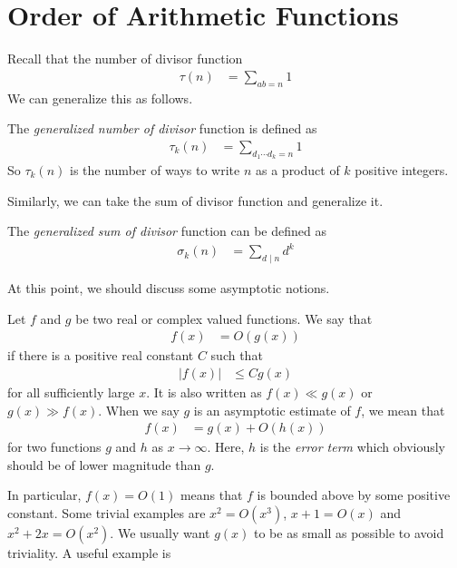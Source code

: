 \documentclass[elemannt.tex]{subfile}
\begin{document}
	\section{Order of Arithmetic Functions}
	Recall that the number of divisor function 
		\begin{align*}
			\tau(n)
				&  =\sum_{ab=n}1
		\end{align*}
	We can generalize this as follows.
		\begin{definition}
			The \textit{generalized number of divisor} function is defined as
				\begin{align*}
					\tau_{k}(n)
						& = \sum_{d_{1}\cdots d_{k}=n}1
				\end{align*}
			So $\tau_{k}(n)$ is the number of ways to write $n$ as a product of $k$ positive integers. 
		\end{definition}
	Similarly, we can take the sum of divisor function and generalize it.
		\begin{definition}
			The \textit{generalized sum of divisor} function can be defined as
				\begin{align*}
					\sigma_{k}(n)
						& = \sum_{d\mid n}d^{k}
				\end{align*}
		\end{definition}
	At this point, we should discuss some asymptotic notions.
		\begin{definition}[Big O]
			Let $f$ and $g$ be two real or complex valued functions. We say that
				\begin{align*}
					f(x)
					& = O(g(x))
				\end{align*}
			if there is a positive real constant $C$ such that
				\begin{align*}
					|f(x)|
					& \leq Cg(x)
				\end{align*}
			for all sufficiently large $x$. It is also written as $f(x)\ll g(x)$  or $g(x)\gg f(x)$. When we say $g$ is an asymptotic estimate of $f$, we mean that
				\begin{align*}
					f(x)
						& = g(x)+O(h(x))
				\end{align*}
			for two functions $g$ and $h$ as $x\to\infty$. Here, $h$ is the \textit{error term} which obviously should be of lower magnitude than $g$.
		\end{definition}
	In particular, $f(x)=O(1)$ means that $f$ is bounded above by some positive constant. Some trivial examples are $x^{2}=O(x^{3})$, $x+1=O(x)$ and $x^{2}+2x=O(x^{2})$. We usually want $g(x)$ to be as small as possible to avoid triviality. A useful example is
\end{document}
